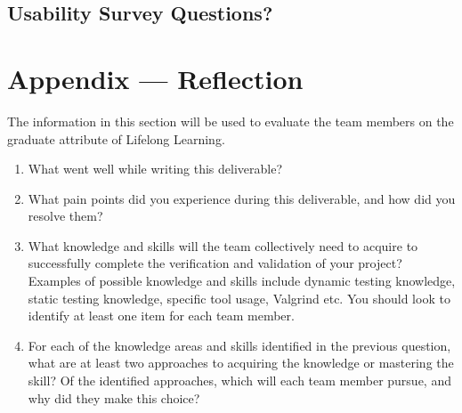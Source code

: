 \documentclass[12pt, titlepage]{article}
\begin{document}
\subsection{Usability Survey Questions?}


\newpage{}
\section*{Appendix --- Reflection}


The information in this section will be used to evaluate the team members on the
graduate attribute of Lifelong Learning.



\begin{enumerate}
  \item What went well while writing this deliverable? 
  \item What pain points did you experience during this deliverable, and how
    did you resolve them?
  \item What knowledge and skills will the team collectively need to acquire to
  successfully complete the verification and validation of your project?
  Examples of possible knowledge and skills include dynamic testing knowledge,
  static testing knowledge, specific tool usage, Valgrind etc.  You should look to
  identify at least one item for each team member.
  \item For each of the knowledge areas and skills identified in the previous
  question, what are at least two approaches to acquiring the knowledge or
  mastering the skill?  Of the identified approaches, which will each team
  member pursue, and why did they make this choice?
\end{enumerate}
\end{document}
